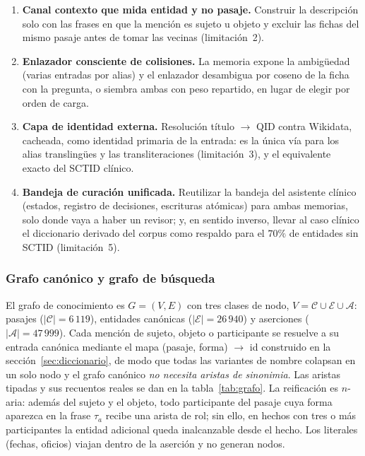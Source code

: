 \documentclass[11pt,a4paper]{article}
\begin{document}
\begin{enumerate}[leftmargin=1.8em, itemsep=1pt, label=E\arabic*.]
  antes el mismo pasaje; limitar por ficha solo la banda del juez, que es
  la que tiene coste.
\item \textbf{Canal contexto que mida entidad y no pasaje.} Construir la
  descripción solo con las frases en que la mención es sujeto u objeto y
  excluir las fichas del mismo pasaje antes de tomar las vecinas
  (limitación~2).
\item \textbf{Enlazador consciente de colisiones.} La memoria expone la
  ambigüedad (varias entradas por alias) y el enlazador desambigua por
  coseno de la ficha con la pregunta, o siembra ambas con peso repartido,
  en lugar de elegir por orden de carga.
\item \textbf{Capa de identidad externa.} Resolución título $\to$ QID
  contra Wikidata, cacheada, como identidad primaria de la entrada: es la
  única vía para los alias translingües y las transliteraciones
  (limitación~3), y el equivalente exacto del SCTID clínico.
\item \textbf{Bandeja de curación unificada.} Reutilizar la bandeja del
  asistente clínico (estados, registro de decisiones, escrituras atómicas)
  para ambas memorias, solo donde vaya a haber un revisor; y, en sentido
  inverso, llevar al caso clínico el diccionario derivado del corpus como
  respaldo para el $70\%$ de entidades sin SCTID (limitación~5).
\end{enumerate}

\subsubsection{Grafo canónico y grafo de búsqueda}
\label{sec:grafo}

El grafo de conocimiento es $G=(V,E)$ con tres clases de nodo,
$V = \mathcal{C} \cup \mathcal{E} \cup \mathcal{A}$: pasajes
($|\mathcal{C}|=6\,119$), entidades canónicas ($|\mathcal{E}|=26\,940$) y
aserciones ($|\mathcal{A}|=47\,999$). Cada mención de sujeto, objeto o
participante se resuelve a su entrada canónica mediante el mapa
(pasaje, forma) $\to$ id construido en la sección~\ref{sec:diccionario}, de
modo que todas las variantes de nombre colapsan en un solo nodo y el grafo
canónico \emph{no necesita aristas de sinonimia}. Las aristas tipadas y sus
recuentos reales se dan en la tabla~\ref{tab:grafo}. La reificación es
$n$-aria: además del sujeto y el objeto, todo participante del pasaje cuya
forma aparezca en la frase $\tau_a$ recibe una arista de rol; sin ello, en
hechos con tres o más participantes la entidad adicional queda inalcanzable
desde el hecho. Los literales (fechas, oficios) viajan dentro de la
aserción y no generan nodos.
\end{document}
